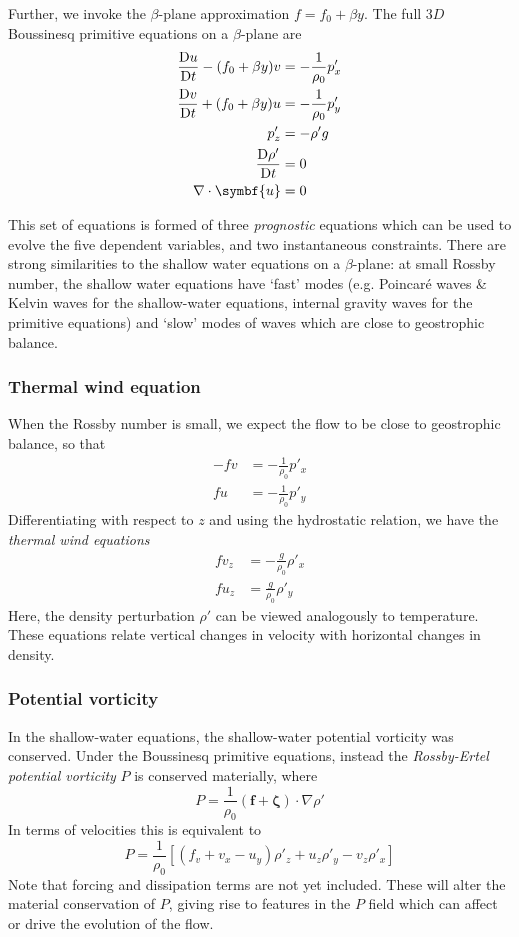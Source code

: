 \documentclass{jknotes}
\begin{document}
Further, we invoke the $\beta$-plane approximation $f = f_0 + \beta y$. The
full $3D$ Boussinesq primitive equations on a $\beta$-plane are
\begin{align}
	\frac{\diffD u}{\diffD t} - (f_0+\beta y)v &= -\frac{1}{\rho_0} p'_x \\
	\frac{\diffD v}{\diffD t} + (f_0 + \beta y) u &= -\frac{1}{\rho_0} p'_y \\
	p'_z &= -\rho' g \\
	\frac{\diffD \rho'}{\diffD t} &= 0\\
	\nabla \cdot \symbf{u} &= 0
\end{align}

This set of equations is formed of three \emph{prognostic} equations which can
be used to evolve the five dependent variables, and two instantaneous
constraints. There are strong similarities to the shallow water equations on a
$\beta$-plane: at small Rossby number, the shallow water equations have
`fast' modes (e.g. Poincar\'{e} waves \& Kelvin waves for the shallow-water
equations, internal gravity waves for the primitive equations) and `slow'
modes of waves which are close to geostrophic balance.

\subsubsection{Thermal wind equation}
When the Rossby number is small, we expect the flow to be close to geostrophic
balance, so that
\begin{align}
	-fv &= -\frac{1}{\rho_0} p'_x \\
	fu &= -\frac{1}{\rho_0} p'_y
\end{align}
Differentiating with respect to $z$ and using the hydrostatic relation, we
have the \emph{thermal wind equations}
\begin{align}
	fv_z &= -\frac{g}{\rho_0} \rho'_x \\
	fu_z &= \frac{g}{\rho_0} \rho'_y
\end{align}
Here, the density perturbation $\rho'$ can be viewed analogously to
temperature. These equations relate vertical changes in velocity with
horizontal changes in density.

\subsubsection{Potential vorticity}
In the shallow-water equations, the shallow-water potential vorticity was
conserved. Under the Boussinesq primitive equations, instead the
\emph{Rossby-Ertel potential vorticity} $P$ is conserved materially, where
\begin{equation}
	P = \frac{1}{\rho_0} (\symbf{f} +\symbf{\zeta})\cdot \nabla \rho'
\end{equation}
In terms of velocities this is equivalent to
\begin{equation}
	P = \frac{1}{\rho_0} \left[ (f_v + v_x - u_y) \rho'_z + u_z \rho'_y -
		v_z
	\rho'_x\right]
\end{equation}
Note that forcing and dissipation terms are not yet included. These will alter
the material conservation of $P$, giving rise to features in the $P$ field
which can affect or drive the evolution of the flow.
\end{document}
